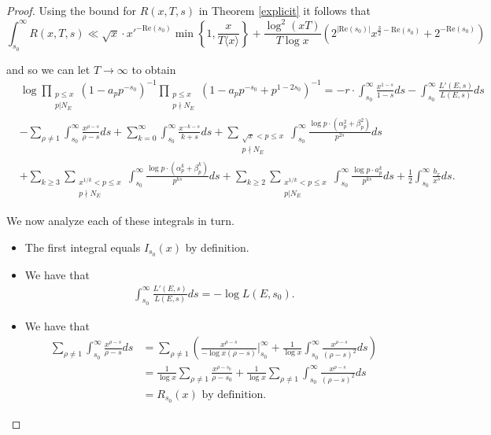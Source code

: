 \documentclass[10pt,a4paper]{amsart}
\renewcommand{\Re}{\mathrm{Re}}
\begin{document}
\begin{proof}
Using the bound for $R(x, T, s)$ in Theorem \ref{explicit} it follows that
\begin{equation*}
\int_{s_0}^{\infty} R(x, T, s) \ll \sqrt x \cdot x'^{-\Re(s_0)} \min \left \{ 1 , \frac{x}{T \langle x \rangle } \right \} + \frac{ \log^2(xT) }{T \log x} \left(  2^{|\Re(s_0)| } x^{\frac{3}{2}-\Re(s_0)} +  2^{-\Re(s_0) }\right)
\end{equation*}

and so we can let $T \to \infty$ to obtain
\begin{align} \label{logeulerproduct} 
& \log \prod_ {\substack{p \leq x \\ p | N_E}}(1-a_pp^{-s_0})^{-1} \prod_ {\substack{p \leq x \\ p \nmid N_E}}  (1-a_pp^{-s_0}+p^{1-2s_0})^{-1}  =  -r\cdot \int_{s_0}^{\infty}\frac{x^{1-s}}{1-s} ds-\int_{s_0}^{\infty}\frac{L'(E, s)}{L(E, s)}ds 
 \nonumber \\
&-\sum_{\rho \neq 1} \int_{s_0}^{\infty} \frac{x^{\rho-s}}{\rho-s}ds   + \sum_{k=0}^{\infty}
\int_{s_0}^{\infty}\frac{x^{-k-s}}{k+s}ds +
 \sum_{\substack{\sqrt x < p \leq x \\ p \nmid  N_E}} \int_{s_0}^{\infty} \frac{\log p \cdot (\alpha_p^2+\beta_p^2)}{p^{2s}}ds \nonumber \\ 
&+ \sum_{k \geq 3} \sum_{\substack{x^{1/k} < p \leq x \\ p \nmid  N_E}} \int_{s_0}^{\infty} \frac{\log p \cdot (\alpha_p^k+\beta_p^k)}{p^{ks}}ds 
+ \sum_{k \geq 2} \sum_{\substack{x^{1/k} < p \leq x \\ p | N_E}} \int_{s_0}^{\infty} \frac{\log p \cdot a_p^k }{p^{ks}}ds+ \frac{1}{2} \int_{s_0}^{\infty} \frac{b_x}{x^s} ds. 
\end{align} 

We now analyze each of these integrals in turn. 


\begin{itemize}

\item The first integral equals $I_{s_0}(x)$ by definition. 


\item We have that 
\begin{align*}
\int_{s_0}^{\infty} \frac{L'(E, s)}{L(E, s)} ds= -\log L(E, s_0). 
\end{align*}

\item We have that 
\begin{align*}
\sum_{\rho \neq 1} \int_{s_0}^{\infty} \frac{x^{\rho-s}}{\rho-s}ds &= \sum_{\rho \neq 1} \left(  \frac{x^{\rho-s}}{- \log x (\rho-s) } \Biggr|_{s_0}^{\infty}+ \frac{1}{\log x} \int_{s_0}^{\infty} \frac{x^{\rho-s}}{(\rho-s)^2}ds \right )  \\
&= \frac{1}{\log x} \sum_{\rho \neq 1} \frac{x^{\rho-s_0}}{\rho-s_0}+ \frac{1}{\log x} \sum_{\rho \neq 1} \int_{s_0}^{\infty} \frac{x^{\rho-s}}{(\rho-s)^2}ds  \\
&= R_{s_0}(x) \textrm{ by definition. }
\end{align*}




\end{itemize}
\end{proof}
\end{document}
